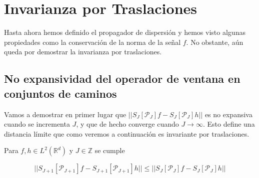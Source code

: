 

\chapter{Invarianza por Traslaciones} \label{ch:seccion14}

\noindent Hasta ahora hemos definido el propagador de dispersión y hemos visto algunas propiedades como la conservación de la norma de la señal $f$. No obstante, aún queda por demostrar la invarianza por traslaciones.

\section{No expansividad del operador de ventana en conjuntos de caminos}
Vamos a demostrar en primer lugar que $||S_J[\mathcal{P}_J] f- S_J[\mathcal{P}_J] h ||$ es no expansiva cuando se incrementa $J$, y que de hecho converge cuando $J \rightarrow \infty$. Esto define una distancia límite que como veremos a continuación es invariante por traslaciones.

\medskip

\begin{proposicion}
\noindent Para $f,h \in L^2(\mathbb{R}^d)$ y $J\in \mathbb{Z}$ se cumple

\begin{equation} \label{eq::1.10}
  || S_{J+1} [\mathcal{P}_{J+1}]f- S_{J+1}[\mathcal{P}_{J+1}]h || \leq ||S_J[\mathcal{P}_J]f - S_J[\mathcal{P}_J]h || 
\end{equation}

\end{proposicion}

